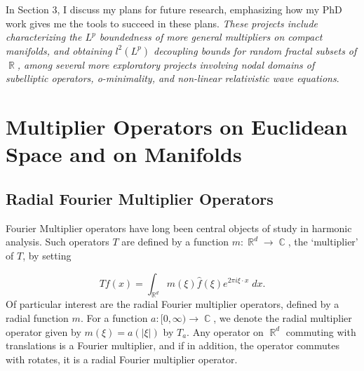 \documentclass[11pt]{article}
\DeclareMathOperator{\RR}{\mathbb{R}}
\DeclareMathOperator{\CC}{\mathbb{C}}
\begin{document}

In Section 3, I discuss my plans for future research, emphasizing how my PhD work gives me the tools to succeed in these plans. \emph{These projects include characterizing the $L^p$ boundedness of more general multipliers on compact manifolds, and obtaining $l^2(L^p)$ decoupling bounds for random fractal subsets of $\RR$, among several more exploratory projects involving nodal domains of subelliptic operators, o-minimality, and non-linear relativistic wave equations}.

\section{Multiplier Operators on Euclidean Space and on Manifolds} \label{Section1}



\subsection{Radial Fourier Multiplier Operators}

Fourier Multiplier operators have long been central objects of study in harmonic analysis. Such operators $T$ are defined by a function $m: \RR^d \to \CC$, the `multiplier' of $T$, by setting

%
\[ Tf(x) = \int_{\RR^d} m(\xi) \widehat{f}(\xi) e^{2 \pi i \xi \cdot x}\; dx. \]
%
Of particular interest are the radial Fourier multiplier operators, defined by a radial function $m$. For a function $a: [0,\infty) \to \CC$, we denote the radial multiplier operator given by $m(\xi) = a(|\xi|)$ by $T_a$. Any operator on $\RR^d$ commuting with translations is a Fourier multiplier, and if in addition, the operator commutes with rotates, it is a radial Fourier multiplier operator. %
\end{document}
